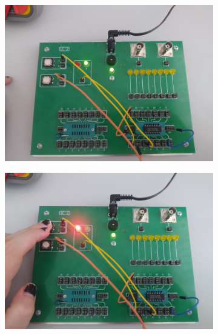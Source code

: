 \begin{itemize}
        \begin{figure}[H]
            \centering
                \begin{subfigure}[h]{0.4\textwidth}
                    \includegraphics[width=\textwidth]{img/XOR/test/1652306732731_scaled.png}
                \end{subfigure}
                \begin{subfigure}[h]{0.4\textwidth}
                    \includegraphics[width=\textwidth]{img/XOR/test/1652306732718_scaled.png}
                \end{subfigure}
                \begin{subfigure}[h]{0.4\textwidth}

\end{subfigure}
\end{figure}
\end{itemize}
